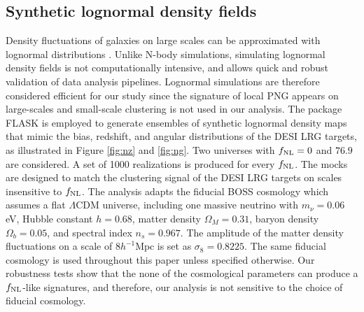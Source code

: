 \subsection{Synthetic lognormal density fields}\label{ssec:mocks}
Density fluctuations of galaxies on large scales can be approximated with lognormal distributions \citep{coles1991, 2017MNRAS.466.1444C}. Unlike N-body simulations, simulating lognormal density fields is not computationally intensive, and allows quick and robust validation of data analysis pipelines. Lognormal simulations are therefore considered efficient for our study since the signature of local PNG appears on large-scales and small-scale clustering is not used in our analysis. The package \textsc{FLASK} \citep[Full-sky Lognormal Astro-fields Simulation Kit;][]{Xavier_2016} is employed to generate ensembles of synthetic lognormal density maps that mimic the bias, redshift, and angular distributions of the DESI LRG targets, as illustrated in Figure \ref{fig:nz} and \ref{fig:ng}. Two universes with $f_{\rm NL}=0$ and $76.9$ are considered. A set of 1000 realizations is produced for every $f_{\rm NL}$. The mocks are designed to match the clustering signal of the DESI LRG targets on scales insensitive to $f_{\rm NL}$. The analysis adapts the fiducial BOSS cosmology \citep{2017MNRAS.470.2617A} which assumes a flat $\Lambda$CDM universe, including one massive neutrino with $m_{\nu}=0.06$ eV, Hubble constant $h = 0.68$, matter density $\Omega_{M}=0.31$, baryon density $\Omega_{b}=0.05$, and spectral index $n_{s}=0.967$. The amplitude of the matter density fluctuations on a scale of $8 h^{-1} \text{Mpc}$ is set as $\sigma_{8}=0.8225$. The same fiducial cosmology is used throughout this paper unless specified otherwise. Our robustness tests show that the none of the cosmological parameters can produce a $f_{\rm NL}$-like signatures, and therefore, our analysis is not sensitive to the choice of fiducial cosmology.



